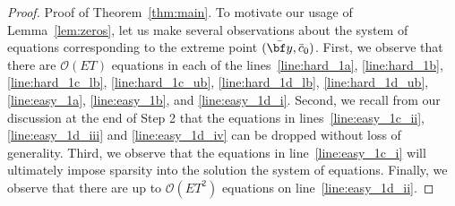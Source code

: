 \documentclass[nonblindrev,mnsc]{informs3} %
\newcommand{\by}{{\bf y}}
\begin{document}
\begin{APPENDICES}
\begin{proof}{Proof of Theorem~\ref{thm:main}. }
To motivate our usage of Lemma~\ref{lem:zeros}, let us make several observations about the system of equations corresponding to the extreme point $(\bar{\by},\bar{c}_0)$. First, we observe that there are $\mathcal{O}(ET)$ equations in each of the lines~\eqref{line:hard_1a}, \eqref{line:hard_1b}, \eqref{line:hard_1c_lb},  \eqref{line:hard_1c_ub}, \eqref{line:hard_1d_lb},  \eqref{line:hard_1d_ub}, \eqref{line:easy_1a}, \eqref{line:easy_1b}, and \eqref{line:easy_1d_i}. Second, we recall from our discussion at the end of  Step 2 that the equations in lines~\eqref{line:easy_1c_ii}, \eqref{line:easy_1d_iii} and \eqref{line:easy_1d_iv}  can be dropped without loss of generality. Third, we observe that the equations in line~\eqref{line:easy_1c_i} will ultimately impose sparsity into the solution the system of equations.  Finally, we observe that there are up to $\mathcal{O}(E T^2)$ equations on line~\eqref{line:easy_1d_ii}. 



\end{proof}
\end{APPENDICES}
\end{document}
